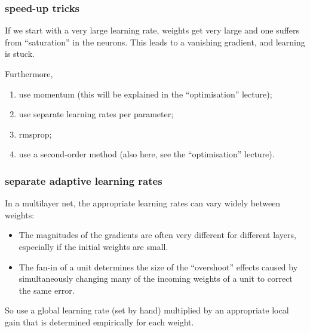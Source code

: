 \documentclass[USenglish,pdftex,compress,10pt,svgnamesi,handout]{beamer}
\begin{document}
\begin{frame}
\frametitle{speed-up tricks}
If we start with a very large learning rate, weights get very large and one suffers from ``saturation'' in the neurons.  This leads to a vanishing gradient, and learning is stuck.

\vskip5mm
Furthermore,
\begin{enumerate}
\item use momentum (this will be explained in the ``optimisation'' lecture);
\item use separate learning rates per parameter;
\item rmsprop;
\item use a second-order method (also here, see the ``optimisation'' lecture).
\end{enumerate}
\end{frame}




\begin{frame}
\frametitle{separate adaptive learning rates}
In a multilayer net, the appropriate learning rates can vary widely between weights:
\begin{itemize}
\item  The magnitudes of the gradients are often very different for different layers, especially if the initial weights are small.
\item  The fan-in of a unit determines the size of the ``overshoot'' effects caused by simultaneously changing many of the incoming weights of a unit to correct the same error.
\end{itemize}

So use a global learning rate (set by hand) multiplied by an appropriate local gain that is determined empirically for each weight.
\end{frame}
\end{document}
